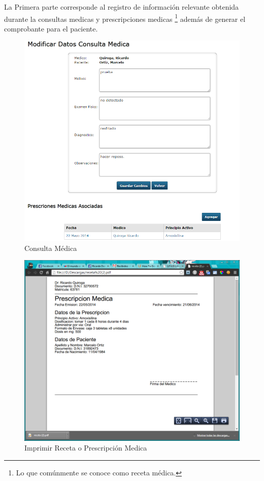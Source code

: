 La Primera parte corresponde al registro de información relevante obtenida durante la consultas medicas y prescripciones medicas \footnote{Lo que comúnmente se conoce como receta médica.} además de generar el comprobante para el paciente.

\begin{figure}[H]
    \centering
    \includegraphics[scale=0.5]{resourse/consulta-medica.png}
    \caption{Consulta Médica}
    \label{fig:616}
\end{figure}

\begin{figure}[H]
    \centering
    \includegraphics[scale=0.3]{resourse/receta.png}
    \caption{Imprimir Receta o Prescripción Medica}
    \label{fig:617}
\end{figure}

